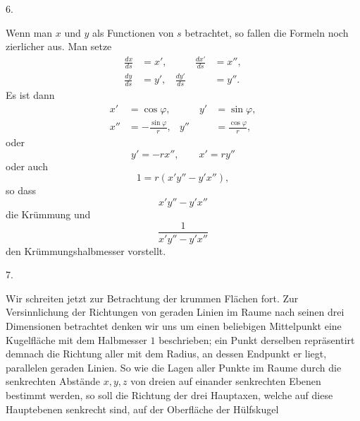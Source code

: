 %
\begin{center}6.\end{center}
\noindent\hspace*{1.2em}Wenn man $x$ und $y$ als Functionen von $s$ betrachtet, so fallen die Formeln noch zierlicher aus. Man setze
\[
\begin{aligned}
\frac{dx}{ds}&=x',&\qquad \frac{dx'}{ds}&=x'',\\
\frac{dy}{ds}&=y',&\frac{dy'}{ds}&=y''.
\end{aligned}
\]
Es ist dann
\[
\begin{aligned}
x'&=\cos\varphi,&\qquad y'&=\sin\varphi,\\
x''&=-\frac{\sin\varphi}{r},&y''&=\frac{\cos\varphi}{r},
\end{aligned}
\]
oder
\[
y'=-rx'',\qquad x'=ry''
\]
oder auch
\[
1=r(x'y''-y'x''),
\]
so dass
\[
x'y''-y'x''
\]
die Krümmung und
\[
\frac{1}{x'y''-y'x''}
\]
den Krümmungshalbmesser vorstellt.

\begin{center}7.\end{center}
\noindent\hspace*{1.2em}Wir schreiten jetzt zur Betrachtung der krummen Flächen fort. Zur Versinnlichung der Richtungen von geraden Linien im Raume nach seinen drei Dimensionen betrachtet denken wir uns um einen beliebigen Mittelpunkt eine Kugelfläche mit dem Halbmesser $1$ beschrieben; ein Punkt derselben repräsentirt demnach die Richtung aller mit dem Radius, an dessen Endpunkt er liegt, parallelen geraden Linien. So wie die Lagen aller Punkte im Raume durch die senkrechten Abstände $x,y,z$ von dreien auf einander senkrechten Ebenen bestimmt werden, so soll die Richtung der drei Hauptaxen, welche auf diese Hauptebenen senkrecht sind, auf der Oberfläche der Hülfskugel

